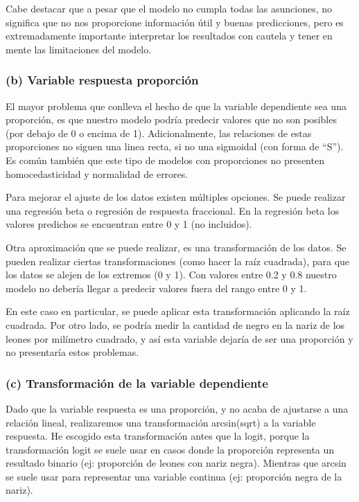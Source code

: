 \documentclass[
]{article}
\begin{document}
Cabe destacar que a pesar que el modelo no cumpla todas las asunciones,
no significa que no nos proporcione información útil y buenas
predicciones, pero es extremadamente importante interpretar los
resultados con cautela y tener en mente las limitaciones del modelo.

\hypertarget{b-variable-respuesta-proporciuxf3n}{%
\subsubsection{(b) Variable respuesta
proporción}\label{b-variable-respuesta-proporciuxf3n}}

El mayor problema que conlleva el hecho de que la variable dependiente
sea una proporción, es que nuestro modelo podría predecir valores que no
son posibles (por debajo de 0 o encima de 1). Adicionalmente, las
relaciones de estas proporciones no siguen una linea recta, si no una
sigmoidal (con forma de ``S''). Es común también que este tipo de
modelos con proporciones no presenten homocedasticidad y normalidad de
errores.

Para mejorar el ajuste de los datos existen múltiples opciones. Se puede
realizar una regresión beta o regresión de respuesta fraccional. En la
regresión beta los valores predichos se encuentran entre 0 y 1 (no
incluidos).

Otra aproximación que se puede realizar, es una transformación de los
datos. Se pueden realizar ciertas transformaciones (como hacer la raíz
cuadrada), para que los datos se alejen de los extremos (0 y 1). Con
valores entre 0.2 y 0.8 nuestro modelo no debería llegar a predecir
valores fuera del rango entre 0 y 1.

En este caso en particular, se puede aplicar esta transformación
aplicando la raíz cuadrada. Por otro lado, se podría medir la cantidad
de negro en la nariz de los leones por milímetro cuadrado, y así esta
variable dejaría de ser una proporción y no presentaría estos problemas.

\hypertarget{c-transformaciuxf3n-de-la-variable-dependiente}{%
\subsubsection{(c) Transformación de la variable
dependiente}\label{c-transformaciuxf3n-de-la-variable-dependiente}}

Dado que la variable respuesta es una proporción, y no acaba de
ajustarse a una relación lineal, realizaremos una transformación
arcsin(sqrt) a la variable respuesta. He escogido esta transformación
antes que la logit, porque la transformación logit se suele usar en
casos donde la proporción representa un resultado binario (ej:
proporción de leones con nariz negra). Mientras que arcsin se suele usar
para representar una variable continua (ej: proporción negra de la
nariz).
\end{document}
